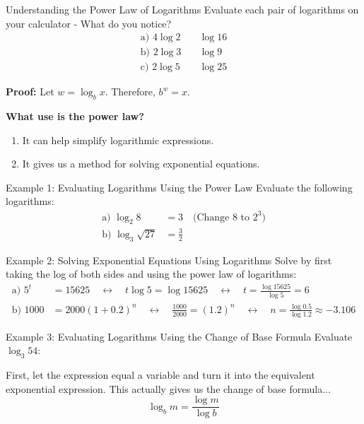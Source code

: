 \documentclass{article}
\begin{document}
\begin{lessonbox}{Understanding the Power Law of Logarithms}
Evaluate each pair of logarithms on your calculator - What do you notice?
\begin{align*}
    \text{a) } 4 \log{2} &\quad \log{16}\\
    \text{b) } 2 \log{3} &\quad \log{9}\\
    \text{c) } 2 \log{5} &\quad \log{25}
\end{align*}

\textbf{Proof:} Let \( w = \log_b{x} \). Therefore, \( b^w = x \).

\textbf{What use is the power law?}
\begin{enumerate}
    \item It can help simplify logarithmic expressions.
    \item It gives us a method for solving exponential equations.
\end{enumerate}
\end{lessonbox}

\begin{examplebox}{Example 1: Evaluating Logarithms Using the Power Law}
Evaluate the following logarithms:
\begin{align*}
    \text{a) } \log_2{8} &= 3 \quad \text{(Change 8 to } 2^3)\\
    \text{b) } \log_3{\sqrt{27}} &= \frac{3}{2}
\end{align*}
\end{examplebox}

\begin{examplebox}{Example 2: Solving Exponential Equations Using Logarithms}
Solve by first taking the log of both sides and using the power law of logarithms:
\begin{align*}
    \text{a) } 5^t &= 15625 \quad \leftrightarrow \quad t \log{5} = \log{15625} \quad \leftrightarrow \quad t = \frac{\log{15625}}{\log{5}} = 6\\
    \text{b) } 1000 &= 2000(1+0.2)^n \quad \leftrightarrow \quad \frac{1000}{2000} = (1.2)^n \quad \leftrightarrow \quad n = \frac{\log{0.5}}{\log{1.2}} \approx -3.106
\end{align*}
\end{examplebox}

\begin{examplebox}{Example 3: Evaluating Logarithms Using the Change of Base Formula}
Evaluate \(\log_3{54}\):

First, let the expression equal a variable and turn it into the equivalent exponential expression. This actually gives us the change of base formula...
\[
\log_b{m} = \frac{\log{m}}{\log{b}}
\]
\end{examplebox}
\end{document}

